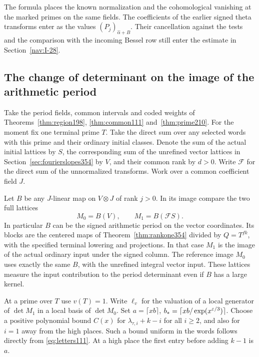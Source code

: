 \documentclass[a4paper,11pt]{article}
\theoremstyle{definition}
\theoremstyle{remark}
\numberwithin{equation}{section}
\begin{document}
The formula places the known normalization and the cohomological
vanishing at the marked primes on the same fields. The coefficients
of the earlier signed theta transforms enter as the values
\((P_j)_{\widehat\alpha+B}\). Their cancellation against the tests
and the comparison with the incoming Bessel row still enter the
estimate in Section~\ref{nav:I-28}.


\subsection{The change of determinant on the image of the arithmetic period}
\label{sec:imagedet355}

Take the period fields, common intervals and coded weights of
Theorems~\ref{thm:region198}, \ref{thm:common111}
and~\ref{thm:prime210}. For the moment fix one terminal prime
\(T\). Take the direct sum over any selected words with this
prime and their ordinary initial classes. Denote the sum of the
actual initial lattices by \(S\), the corresponding sum of the
unrefined vector lattices in Section~\ref{sec:fourierslopes354}
by \(V\), and their common rank by \(d>0\).
Write \(\mathcal F\) for the direct sum of the unnormalized
transforms. Work over a common coefficient field \(J\).

Let \(B\) be any \(J\)-linear map on \(V\otimes J\) of rank
\(j>0\). In its image compare the two full lattices
\[
               M_0=B(V),\qquad M_1=B(\mathcal F S).
\]
In particular \(B\) can be the signed arithmetic period on the
vector coordinates. Its blocks are the centered maps of
Theorem~\ref{thm:rankone354} divided by \(Q=T^{fk}\), with the
specified terminal lowering and projections. In that case
\(M_1\) is the image of the actual ordinary input under the
signed column. The reference image \(M_0\) uses exactly the
same \(B\), with the unrefined integral vector input. These
lattices measure the input contribution to the period
determinant even if \(B\) has a large kernel.

At a prime over \(T\) use \(v(T)=1\). Write \(\ell_v\) for the
valuation of a local generator of \(\det M_1\) in a local
basis of \(\det M_0\). Set \(a=\lceil xb\rceil\),
\(b_*=\lceil xb/\exp(x^{\varepsilon/3})\rceil\). Choose a positive
polynomial bound \(C(x)\) for \(\lambda_{\tau,i}+k-i\) for
all \(i\ge2\), and also for \(i=1\) away from the high places.
Such a bound uniform in the words follows directly from
\eqref{eq:letters111}. At a high place the first entry before
adding \(k-1\) is \(a\).
\end{document}
